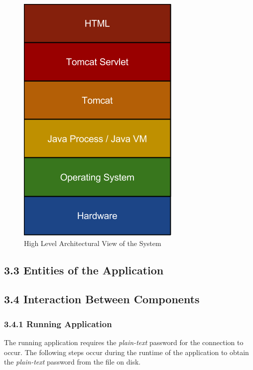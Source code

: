 \documentclass[11pt, a4paper, twoside, openright, notitlepage]{report}
\begin{document}
\begin{figure}[h!]
    \centering
    \includegraphics[height=0.2\paperheight]{high-level-archecuture}
    \caption{High Level Architectural View of the System}
\end{figure}

\subsection*{3.3 Entities of the Application}


\subsection*{3.4 Interaction Between Components}
\subsubsection*{3.4.1 Running Application}
The running application requires the \emph{plain-text} password for the connection to occur. The following steps occur during the runtime of the application to obtain the \emph{plain-text} password from the file on disk. 
\end{document}
